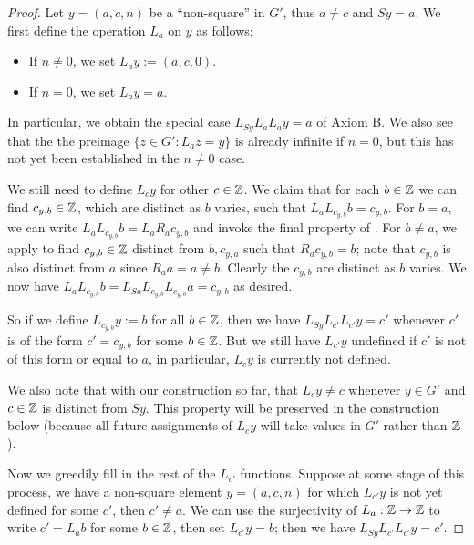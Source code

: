 \begin{proof}  Let $y = (a,c,n)$ be a ``non-square'' in $G'$, thus $a \neq c$ and $Sy = a$.  We first define the operation $L_a$ on $y$ as follows:
\begin{itemize}
  \item If $n \neq 0$, we set $L_a y := (a,c,0)$.
  \item If $n=0$, we set $L_a y = a$.
\end{itemize}
In particular, we obtain the special case $L_{Sy} L_a L_a y = a$ of Axiom B.  We also see that the the preimage $\{ z \in G': L_a z = y \}$ is already infinite if $n = 0$, but this has not yet been established in the $n \neq 0$ case.

We still need to define $L_c y$ for other $c \in \mathbb{Z}$.  We claim that for each $b \in \mathbb{Z}$ we can find $c_{y,b} \in \mathbb{Z}$, which are distinct as $b$ varies, such that
$L_a L_{c_{y,b}} b = c_{y,b}$.  For $b=a$, we can write $L_a L_{c_{y,b}} b = L_a R_a c_{y,b}$ and invoke the final property of .  For $b \neq a$, we apply  to find $c_{y,b} \in \mathbb{Z}$ distinct from $b, c_{y,a}$ such that $R_a c_{y,b} = b$; note that $c_{y,b}$ is also distinct from $a$ since $R_a a = a \neq b$.  Clearly the $c_{y,b}$ are distinct as $b$ varies.  We now have $L_a L_{c_{y,b}} b = L_{Sa} L_{c_{y,b}} L_{c_{y,b}} a = c_{y,b}$ as desired.

So if we define $L_{c_{y,b}} y := b$ for all $b \in \mathbb{Z}$, then we have $L_{Sy} L_{c'} L_{c'} y = c'$ whenever $c'$ is of the form $c' = c_{y,b}$ for some $b \in \mathbb{Z}$.  But we still have $L_{c'} y$ undefined if $c'$ is not of this form or equal to $a$, in particular, $L_c y$ is currently not defined.

We also note that with our construction so far, that $L_c y \neq c$ whenever $y \in G'$ and $c \in \mathbb{Z}$ is distinct from $Sy$.  This property will be preserved in the construction below (because all future assignments of $L_c y$ will take values in $G'$ rather than $\mathbb{Z}$).

Now we greedily fill in the rest of the $L_{c'}$ functions.  Suppose at some stage of this process, we have a non-square element $y = (a,c,n)$ for which $L_{c'} y$ is not yet defined for some $c'$, then $c' \neq a$. We can use the surjectivity of $L_a: \mathbb{Z} \to \mathbb{Z}$ to write $c' = L_a b$ for some $b \in \mathbb{Z}$, then set $L_{c'} y = b$; then we have $L_{Sy} L_{c'} L_{c'} y = c'$.


\end{proof}
